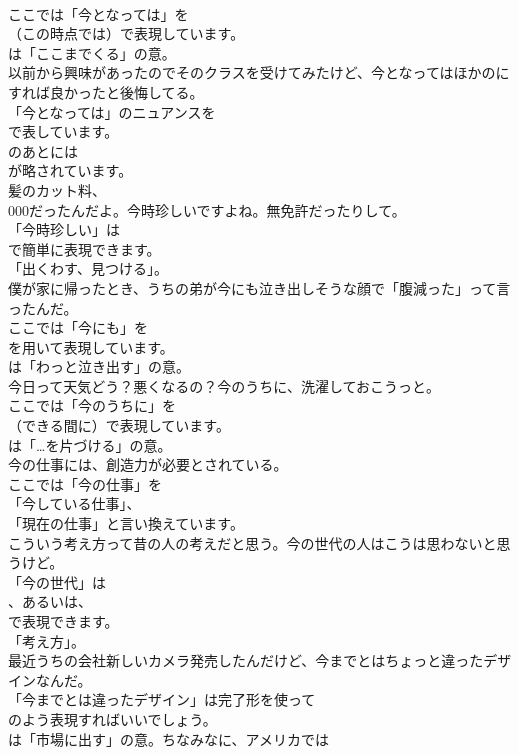 \documentclass[8pt]{extreport}
\begin{document}
\begin{CJK}{UTF8}{min}
\\	ここでは「今となっては」を 
\\	（この時点では）で表現しています。
\\	は「ここまでくる」の意。	
\\	以前から興味があったのでそのクラスを受けてみたけど、今となってはほかのにすれば良かったと後悔してる。 
\\	「今となっては」のニュアンスを 
\\	で表しています。
\\	のあとには 
\\	が略されています。	
\\	髪のカット料、
\\	000だったんだよ。今時珍しいですよね。無免許だったりして。 
\\	「今時珍しい」は
\\	で簡単に表現できます。
\\	「出くわす、見つける」。	
\\	僕が家に帰ったとき、うちの弟が今にも泣き出しそうな顔で「腹減った」って言ったんだ。 
\\	ここでは「今にも」を 
\\	を用いて表現しています。
\\	は「わっと泣き出す」の意。	
\\	今日って天気どう？悪くなるの？今のうちに、洗濯しておこうっと。 
\\	ここでは「今のうちに」を 
\\	（できる間に）で表現しています。
\\	は「…を片づける」の意。	
\\	今の仕事には、創造力が必要とされている。 
\\	ここでは「今の仕事」を
\\	「今している仕事」、
\\	「現在の仕事」と言い換えています。	
\\	こういう考え方って昔の人の考えだと思う。今の世代の人はこうは思わないと思うけど。 
\\	「今の世代」は
\\	、あるいは、
\\	で表現できます。
\\	「考え方」。	
\\	最近うちの会社新しいカメラ発売したんだけど、今までとはちょっと違ったデザインなんだ。 
\\	「今までとは違ったデザイン」は完了形を使って
\\	のよう表現すればいいでしょう。
\\	は「市場に出す」の意。ちなみなに、アメリカでは

\end{CJK}
\end{document}
